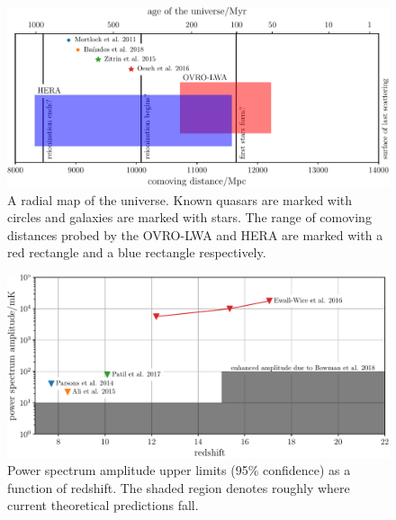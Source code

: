 \begin{bibunit}
\begin{figure}[t]
    \centering
    \includegraphics[width=\textwidth]{figures/chapter1/history-of-the-universe/history-of-the-universe}
    \caption{
        A radial map of the universe. Known quasars are marked with circles and galaxies are marked
        with stars. The range of comoving distances probed by the OVRO-LWA and HERA are marked with a red
        rectangle and a blue rectangle respectively.
    }
    \label{fig:history-of-the-universe}
\end{figure}

\begin{figure}[t]
    \centering
    \includegraphics[width=\textwidth]{figures/chapter1/power-spectrum-upper-limits/power-spectrum-upper-limits}
    \caption{
        Power spectrum amplitude upper limits (95\% confidence) as a function of redshift. The
        shaded region denotes roughly where current theoretical predictions fall.
    }
    \label{fig:power-spectrum-upper-limits}
\end{figure}












\end{bibunit}

